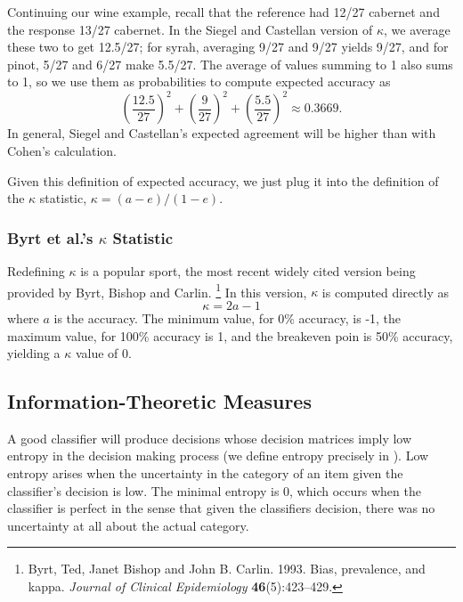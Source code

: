 Continuing our wine example, recall that the reference had 12/27
cabernet and the response 13/27 cabernet.  In the Siegel and Castellan
version of $\kappa$, we average these two to get 12.5/27; for syrah,
averaging 9/27 and 9/27 yields 9/27, and for pinot, 5/27 and 6/27 make
5.5/27.  The average of values summing to 1 also sums to 1, so we use
them as probabilities to compute expected accuracy as
%
\begin{equation}
\left( \frac{12.5}{27} \right)^2
+ \left( \frac{9}{27} \right)^2
+ \left( \frac{5.5}{27} \right)^2
\approx 0.3669.
\end{equation}
%
In general, Siegel and Castellan's expected agreement will be higher
than with Cohen's calculation.

Given this definition of expected accuracy, we just plug it into the
definition of the $\kappa$ statistic, $\kappa = (a - e)/(1 - e)$.


\subsubsection{Byrt et al.'s $\kappa$ Statistic}

Redefining $\kappa$ is a popular sport, the most recent widely cited
version being provided by Byrt, Bishop and Carlin.%
%
\footnote{Byrt, Ted, Janet Bishop and John B. Carlin. 1993. Bias,
  prevalence, and kappa. {\it Journal of Clinical Epidemiology}
  {\bf 46}(5):423--429.}
%
In this version, $\kappa$ is computed directly as
%
\begin{equation}
\kappa = 2 a - 1
\end{equation}
%
where $a$ is the accuracy.  The minimum value, for 0\% accuracy,
is -1, the maximum value, for 100\% accuracy is 1, and the
breakeven poin is 50\% accuracy, yielding a $\kappa$ value of 0.


\subsection{Information-Theoretic Measures}

A good classifier will produce decisions whose decision matrices imply
low entropy in the decision making process (we define entropy
precisely in ).  Low entropy arises when the
uncertainty in the category of an item given the classifier's decision
is low.  The minimal entropy is 0, which occurs when the classifier is
perfect in the sense that given the classifiers decision, there was no
uncertainty at all about the actual category.  

